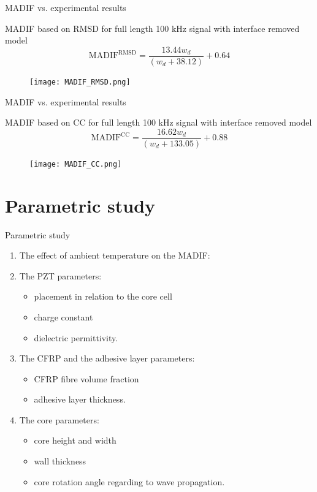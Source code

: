 \documentclass[10pt,aspectratio=169]{beamer} %
\begin{document}
\begin{frame}[label=frame22]{MADIF vs. experimental results}
	\begin{block}{MADIF based on RMSD for full length 100 kHz signal with interface removed model}
		\footnotesize
		\begin{equation*}
			\mathrm{MADIF}^\mathrm{RMSD} = \frac{13.44w_d}{(w_d+38.12)}+0.64
			\label{eq:rmsd}
		\end{equation*}
	\end{block}
\begin{figure}
	\texttt{[image: MADIF\_RMSD.png]}
	\label{fig:MADIF_RMSD}
\end{figure}
\end{frame}
\begin{frame}[label=frame22]{MADIF vs. experimental results}
	\begin{block}{MADIF based on CC for full length 100 kHz signal with interface removed model}
		\footnotesize
		\begin{equation*}
			\mathrm{MADIF}^\mathrm{CC} = \frac{16.62w_d}{(w_d+133.05)}+0.88
			\label{eq:cc}
		\end{equation*}
	\end{block}
	\begin{figure}
		\texttt{[image: MADIF\_CC.png]}
		\label{fig:MADIF_CC}
	\end{figure}
\end{frame}
\section{Parametric study}
\begin{frame}[label=frame25]{Parametric study}
	\begin{enumerate}
		\item The effect of ambient temperature on the MADIF:
		\item The PZT parameters:
		\begin{itemize}
			\item placement in relation to the core cell
			\item charge constant
			\item dielectric permittivity.
		\end{itemize}
		\item The CFRP and the adhesive layer parameters:
		\begin{itemize}
			\item CFRP fibre volume fraction
			\item adhesive layer thickness.
		\end{itemize}
		\item The core parameters:
		\begin{itemize}
			\item core height and width
			\item wall thickness
			\item core rotation angle regarding to wave propagation.
		\end{itemize}
	\end{enumerate}
\end{frame}
\end{document}
